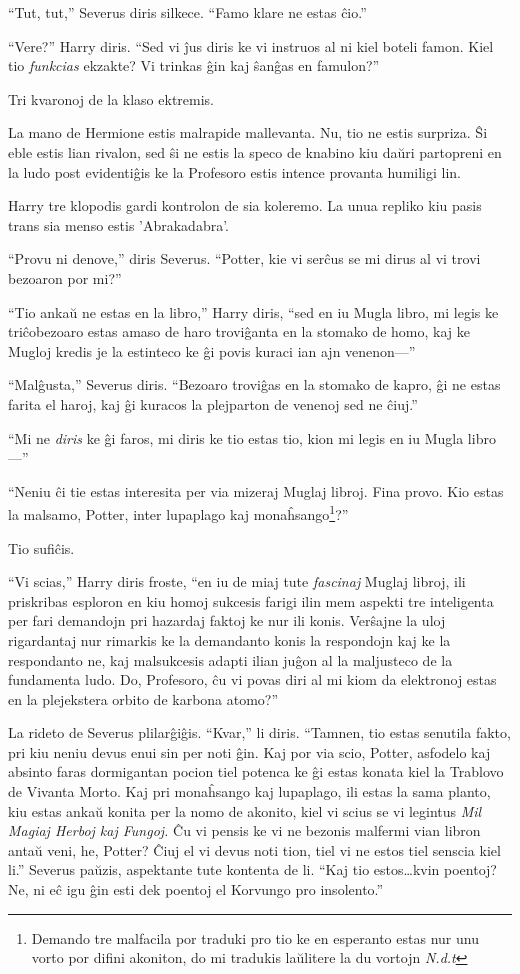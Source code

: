 ``Tut, tut,'' Severus diris silkece. ``Famo klare ne estas ĉio.''

``Vere?'' Harry diris. ``Sed vi ĵus diris ke vi instruos al ni kiel
boteli famon. Kiel tio \emph{funkcias} ekzakte? Vi trinkas ĝin kaj
ŝanĝas en famulon?''

Tri kvaronoj de la klaso ektremis.

La mano de Hermione estis malrapide mallevanta. Nu, tio ne estis
surpriza. Ŝi eble estis lian rivalon, sed ŝi ne estis la speco de
knabino kiu daŭri partopreni en la ludo post evidentiĝis ke la
Profesoro estis intence provanta humiligi lin.

Harry tre klopodis gardi kontrolon de sia koleremo. La unua repliko
kiu pasis trans sia menso estis 'Abrakadabra'.

``Provu ni denove,'' diris Severus. ``Potter, kie vi serĉus se mi
dirus al vi trovi bezoaron por mi?''

``Tio ankaŭ ne estas en la libro,'' Harry diris, ``sed en iu Mugla
libro, mi legis ke triĉobezoaro estas amaso de haro troviĝanta en la
stomako de homo, kaj ke Mugloj kredis je la estinteco ke ĝi povis
kuraci ian ajn venenon—''

``Malĝusta,'' Severus diris. ``Bezoaro troviĝas en la stomako de
kapro, ĝi ne estas farita el haroj, kaj ĝi kuracos la plejparton de
venenoj sed ne ĉiuj.''

``Mi ne \emph{diris} ke ĝi faros, mi diris ke tio estas tio, kion mi
legis en iu Mugla libro—''

``Neniu ĉi tie estas interesita per via mizeraj Muglaj libroj. Fina
provo. Kio estas la malsamo, Potter, inter lupaplago kaj
monaĥsango\footnote{Demando tre malfacila por traduki pro tio ke en
esperanto estas nur unu vorto por difini akoniton, do mi tradukis
laŭlitere la du vortojn \emph {N.d.t}}?''

Tio sufiĉis.

``Vi scias,'' Harry diris froste, ``en iu de miaj tute \emph{fascinaj}
Muglaj libroj, ili priskribas esploron en kiu homoj sukcesis farigi
ilin mem aspekti tre inteligenta per fari demandojn pri hazardaj
faktoj ke nur ili konis. Verŝajne la uloj rigardantaj nur rimarkis ke
la demandanto konis la respondojn kaj ke la respondanto ne, kaj
malsukcesis adapti ilian juĝon al la maljusteco de la fundamenta
ludo. Do, Profesoro, ĉu vi povas diri al mi kiom da elektronoj estas
en la plejekstera orbito de karbona atomo?''

La rideto de Severus plilarĝiĝis. ``Kvar,'' li diris. ``Tamnen, tio
estas senutila fakto, pri kiu neniu devus enui sin per noti ĝin. Kaj
por via scio, Potter, asfodelo kaj absinto faras dormigantan pocion
tiel potenca ke ĝi estas konata kiel la Trablovo de Vivanta Morto. Kaj
pri monaĥsango kaj lupaplago, ili estas la sama planto, kiu estas
ankaŭ konita per la nomo de akonito, kiel vi scius se vi legintus
\emph{Mil Magiaj Herboj kaj Fungoj.}  Ĉu vi pensis ke vi ne bezonis
malfermi vian libron antaŭ veni, he, Potter? Ĉiuj el vi devus noti
tion, tiel vi ne estos tiel senscia kiel li.'' Severus paŭzis,
aspektante tute kontenta de li. ``Kaj tio estos\ldots kvin poentoj?
Ne, ni eĉ igu ĝin esti dek poentoj el Korvungo pro insolento.''

